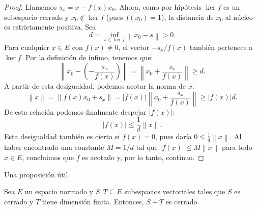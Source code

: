 \begin{proof}
	Llamemos $s_x = x - f(x) x_0$. Ahora, como por hipótesis $\ker f$ es un subespacio cerrado y $x_0 \notin \ker f$ (pues $f(x_0)=1$), la distancia de $x_0$ al núcleo es estrictamente positiva. Sea
	\begin{equation*}
		d = \inf_{s \in \ker f} \left\lVert x_0 - s \right\rVert > 0.
	\end{equation*}
	Para cualquier $x \in E$ con $f(x) \ne 0$, el vector $-s_x/f(x)$ también pertenece a $\ker f$. Por la definición de ínfimo, tenemos que:
	\begin{equation*}
		\left\lVert x_0 - \left( -\frac{s_x}{f(x)} \right) \right\rVert = \left\lVert x_0 + \frac{s_x}{f(x)} \right\rVert \ge d.
	\end{equation*}
	A partir de esta desigualdad, podemos acotar la norma de $x$:
	\begin{equation*}
		\left\lVert x \right\rVert = \left\lVert f(x) x_0 + s_x \right\rVert = \left\lvert f(x) \right\rvert \left\lVert x_0 + \frac{s_x}{f(x)} \right\rVert \ge \left\lvert f(x) \right\rvert d.
	\end{equation*}
	De esta relación podemos finalmente despejar $\left\lvert f(x) \right\rvert$:
	\begin{equation*}
		\left\lvert f(x) \right\rvert \le \frac{1}{d} \left\lVert x \right\rVert.
	\end{equation*}
	Esta desigualdad también es cierta si $f(x)=0$, pues daría $0 \le \frac{1}{d} \left\lVert x \right\rVert$. Al haber encontrado una constante $M = 1/d$ tal que $\left\lvert f(x) \right\rvert \le M \left\lVert x \right\rVert$ para todo $x \in E$, concluimos que $f$ es acotado y, por lo tanto, continuo.
\end{proof}

Una proposición útil.

\begin{proposition}
	Sea $E$ un espacio normado y $S, T \subseteq E$ subespacios vectoriales tales que $S$ es cerrado y $T$ tiene dimensión finita. Entonces, $S + T$ es cerrado.
\end{proposition}

